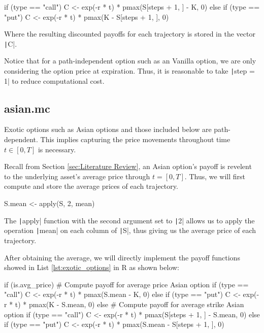 \begin{Rminted}
if (type == "call") {
    C <- exp(-r * t) * pmax(S[steps + 1, ] - K, 0)
} else if (type == "put") {
    C <- exp(-r * t) * pmax(K - S[steps + 1, ], 0)
}
\end{Rminted}

Where the resulting discounted payoffs for each trajectory is stored in the vector \texttt|C|.

Notice that for a path-independent option such as an Vanilla option, we are only considering the option price at expiration. Thus, it is reasonable to take \texttt|step = 1| to reduce computational cost.

\subsection{asian.mc}

Exotic options such as Asian options and those included below are path-dependent. This implies capturing the price movements throughout time $t\in[0,T]$ is necessary.

Recall from Section \ref{sec:Literature Review}, an Asian option's payoff is revelent to the underlying asset's average price through $t=[0,T]$. Thus, we will first compute and store the average prices of each trajectory.

\begin{Rminted}
S.mean <- apply(S, 2, mean)
\end{Rminted}

The \texttt|apply| function with the second argument set to \texttt|2| allows us to apply the operation \texttt|mean| on each column of \texttt|S|, thus giving us the average price of each trajectory.

After obtaining the average, we will directly implement the payoff functions showed in List \ref{lst:exotic_options} in R as shown below:

\begin{Rminted}
if (is.avg_price) { # Compute payoff for average price Asian option
    if (type == "call") {
        C <- exp(-r * t) * pmax(S.mean - K, 0)
    } else if (type == "put") {
        C <- exp(-r * t) * pmax(K - S.mean, 0)
    }
} else { # Compute payoff for average strike Asian option
    if (type == "call") {
        C <- exp(-r * t) * pmax(S[steps + 1, ] - S.mean, 0)
    } else if (type == "put") {
        C <- exp(-r * t) * pmax(S.mean - S[steps + 1, ], 0)
    }
}
\end{Rminted}


